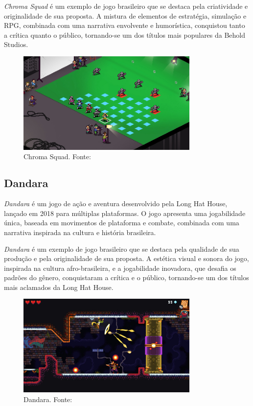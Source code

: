 \textit{Chroma Squad} é um exemplo de jogo brasileiro que se destaca pela criatividade e originalidade de sua proposta. A mistura de elementos de estratégia, simulação e RPG, combinada com uma narrativa envolvente e humorística, conquistou tanto a crítica quanto o público, tornando-se um dos títulos mais populares da Behold Studios.

\begin{figure}[H]
    \centering
    \includegraphics[width=0.8\textwidth]{figuras/Chroma Squad.jpg}
    \caption{Chroma Squad. Fonte: \cite{chromaSquad}}
    \label{fig:chroma-squad}
\end{figure}

\subsection{Dandara}
\textit{Dandara} é um jogo de ação e aventura desenvolvido pela Long Hat House, lançado em 2018 para múltiplas plataformas. O jogo apresenta uma jogabilidade única, baseada em movimentos de plataforma e combate, combinada com uma narrativa inspirada na cultura e história brasileira.

\textit{Dandara} é um exemplo de jogo brasileiro que se destaca pela qualidade de sua produção e pela originalidade de sua proposta. A estética visual e sonora do jogo, inspirada na cultura afro-brasileira, e a jogabilidade inovadora, que desafia os padrões do gênero, conquistaram a crítica e o público, tornando-se um dos títulos mais aclamados da Long Hat House.

\begin{figure}[H]
    \centering
    \includegraphics[width=0.8\textwidth]{figuras/Dandara.jpg}
    \caption{Dandara. Fonte: \cite{dandara}}
    \label{fig:dandara}
\end{figure}

